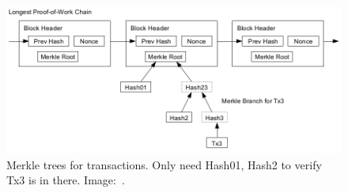 \begin{frame}
  \begin{figure}
    \includegraphics[width=\textwidth]{fig/bitcoin-powchain.png}
    \caption{Merkle trees for transactions.
      Only need Hash01, Hash2 to verify Tx3 is in there.
    Image:~\cite{Nakamoto2008bap}.}
  \end{figure}
\end{frame}

